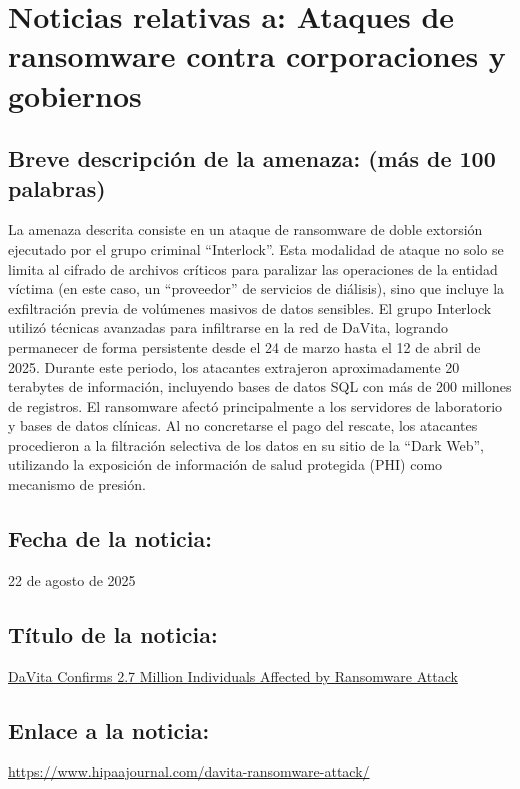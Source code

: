 \chapter{Noticias relativas a: Ataques de ransomware contra corporaciones y gobiernos}


    \section{Breve descripción de la amenaza: (más de 100 palabras)}
    
    La amenaza descrita consiste en un ataque de ransomware de doble extorsión ejecutado por el grupo criminal ``Interlock''. 
    Esta modalidad de ataque no solo se limita al cifrado de archivos críticos para paralizar las operaciones de la entidad víctima 
    (en este caso, un ``proveedor'' de servicios de diálisis), sino que incluye la exfiltración previa de volúmenes masivos 
    de datos sensibles. El grupo Interlock utilizó técnicas avanzadas para infiltrarse en la red de DaVita, logrando permanecer
     de forma persistente desde el 24 de marzo hasta el 12 de abril de 2025. Durante este periodo, los atacantes extrajeron 
     aproximadamente 20 terabytes de información, incluyendo bases de datos SQL con más de 200 millones de registros. 
     El ransomware afectó principalmente a los servidores de laboratorio y bases de datos clínicas. Al no concretarse el 
     pago del rescate, los atacantes procedieron a la filtración selectiva de los datos en su sitio de la ``Dark Web'', utilizando
      la exposición de información de salud protegida (PHI) como mecanismo de presión.

    \section{Fecha de la noticia:}
    22 de agosto de 2025

    \section{Título de la noticia:}
    \href{https://www.hipaajournal.com/davita-ransomware-attack/}{DaVita Confirms 2.7 Million Individuals Affected by Ransomware Attack}

    \section{Enlace a la noticia:}

    \href{https://www.hipaajournal.com/davita-ransomware-attack/}{https://www.hipaajournal.com/davita-ransomware-attack/}

